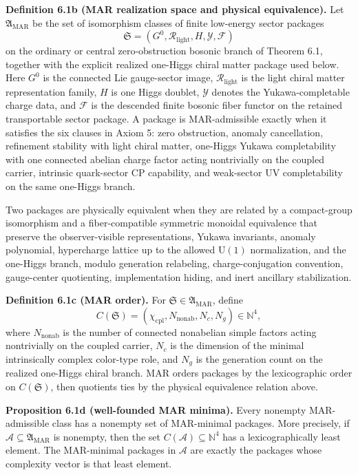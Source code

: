 \textbf{Definition 6.1b (MAR realization space and physical equivalence).} Let
\(\mathfrak A_{\mathrm{MAR}}\) be the set of isomorphism classes of finite low-energy sector packages
\[
\mathfrak S=(G^0,\mathcal R_{\mathrm{light}},H,\mathcal Y,\mathcal F)
\]
on the ordinary or central zero-obstruction bosonic branch of Theorem 6.1, together with the explicit realized one-Higgs chiral matter package used below. Here \(G^0\) is the connected Lie gauge-sector image, \(\mathcal R_{\mathrm{light}}\) is the light chiral matter representation family, \(H\) is one Higgs doublet, \(\mathcal Y\) denotes the Yukawa-completable charge data, and \(\mathcal F\) is the descended finite bosonic fiber functor on the retained transportable sector package. A package is MAR-admissible exactly when it satisfies the six clauses in Axiom 5: zero obstruction, anomaly cancellation, refinement stability with light chiral matter, one-Higgs Yukawa completability with one connected abelian charge factor acting nontrivially on the coupled carrier, intrinsic quark-sector CP capability, and weak-sector UV completability on the same one-Higgs branch.

Two packages are physically equivalent when they are related by a compact-group isomorphism and a fiber-compatible symmetric monoidal equivalence that preserve the observer-visible representations, Yukawa invariants, anomaly polynomial, hypercharge lattice up to the allowed \(\mathrm U(1)\) normalization, and the one-Higgs branch, modulo generation relabeling, charge-conjugation convention, gauge-center quotienting, implementation hiding, and inert ancillary stabilization.

\textbf{Definition 6.1c (MAR order).} For \(\mathfrak S\in\mathfrak A_{\mathrm{MAR}}\), define
\[
C(\mathfrak S)=(\chi_{\mathrm{cpl}},N_{\mathrm{nonab}},N_c,N_g)\in\mathbb N^4,
\]
where \(N_{\mathrm{nonab}}\) is the number of connected nonabelian simple factors acting nontrivially on the coupled carrier, \(N_c\) is the dimension of the minimal intrinsically complex color-type role, and \(N_g\) is the generation count on the realized one-Higgs chiral branch. MAR orders packages by the lexicographic order on \(C(\mathfrak S)\), then quotients ties by the physical equivalence relation above.

\textbf{Proposition 6.1d (well-founded MAR minima).} Every nonempty MAR-admissible class has a nonempty set of MAR-minimal packages. More precisely, if \(\mathcal A\subseteq\mathfrak A_{\mathrm{MAR}}\) is nonempty, then the set \(C(\mathcal A)\subseteq\mathbb N^4\) has a lexicographically least element. The MAR-minimal packages in \(\mathcal A\) are exactly the packages whose complexity vector is that least element.

